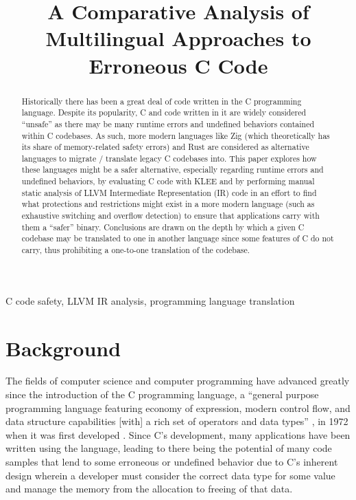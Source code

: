 \documentclass[conference]{IEEEtran}
\begin{document}
\title{A Comparative Analysis of Multilingual Approaches to Erroneous C Code}

\author{
}

\maketitle

\begin{abstract}
Historically there has been a great deal of code written in the C programming
language. Despite its popularity, C and code written in it are widely
considered ``unsafe'' as there may be many runtime errors and undefined
behaviors contained within C codebases. As such, more modern languages like
Zig (which theoretically has its share of memory-related safety errors) and
Rust are considered as alternative languages to migrate / translate legacy C
codebases into. This paper explores how these languages might be a safer
alternative, especially regarding runtime errors and undefined behaviors, by
evaluating C code with KLEE and by performing manual static analysis of LLVM
Intermediate Representation (IR) code in an effort to find what protections
and restrictions might exist in a more modern language (such as exhaustive
switching and overflow detection) to ensure that applications carry with them
a ``safer'' binary. Conclusions are drawn on the depth by which a given C
codebase may be translated to one in another language since some features of
C do not carry, thus prohibiting a one-to-one translation of the codebase.
\end{abstract}

\begin{IEEEkeywords}
C code safety, LLVM IR analysis, programming language translation
\end{IEEEkeywords}

\section{Background}
The fields of computer science and computer programming have advanced greatly
since the introduction of the C programming language, a ``general purpose
programming language featuring economy of expression, modern control flow, and
data structure capabilities [with] a rich set of operators and data types''
\cite{ritchie1978c}, in 1972 when it was first developed
\cite{tyagi2014tribute}. Since C's development, many applications have been
written using the language, leading to there being the potential of many code
samples that lend to some erroneous or undefined behavior due to C's inherent
design wherein a developer must consider the correct data type for some value
and manage the memory from the allocation to freeing of that data.
\end{document}
